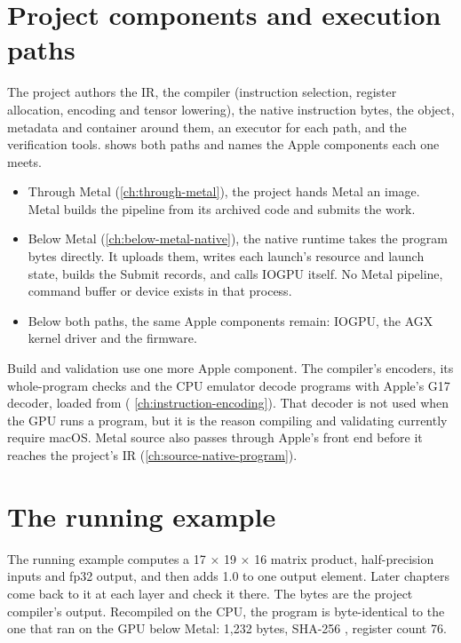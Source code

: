 \section{Project components and execution paths}\label{sec:project-authors-two}

The project authors the IR, the compiler (instruction selection, register allocation, encoding and tensor lowering),
the native instruction bytes, the object, metadata and container around them, an executor for each path, and the
verification tools.  shows both paths and names the Apple components each one meets.



\begin{itemize}
\item Through Metal (\cref{ch:through-metal}), the project hands Metal an image. Metal builds the pipeline from its
  archived code and submits the work.
\item Below Metal (\cref{ch:below-metal-native}), the native runtime takes the program bytes directly. It uploads them,
  writes each launch's resource and launch state, builds the Submit records, and calls IOGPU itself. No Metal
  pipeline, command buffer or device exists in that process.
\item Below both paths, the same Apple components remain: IOGPU, the AGX kernel driver and the firmware.
\end{itemize}

Build and validation use one more Apple component. The compiler's encoders, its whole-program
checks and the CPU emulator decode programs with Apple's G17 decoder, loaded from  (
\cref{ch:instruction-encoding}). That decoder is not used when the GPU runs a program, but it is the reason compiling and
validating currently require macOS. Metal source also passes through Apple's  front end before it reaches the
project's IR (\cref{ch:source-native-program}).

\section{The running example}\label{sec:one-program-ir}

The running example computes a 17 × 19 × 16 matrix product, half-precision inputs and fp32 output, and then adds 1.0
to one output element. Later chapters come back to it at each layer and check it there. The bytes are the project compiler's output. Recompiled on the CPU, the program is byte-identical to
the one that ran on the GPU below Metal: 1,232 bytes, SHA-256 ,
register count 76.

